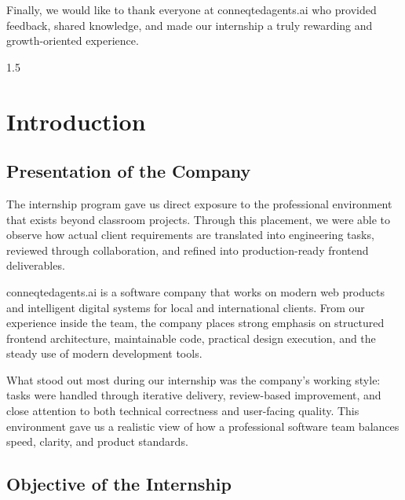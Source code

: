 \documentclass[12pt, oneside, a4paper]{book}
\begin{document}
\begin{doublespace}
Finally, we would like to thank everyone at conneqtedagents.ai who provided feedback,
shared knowledge, and made our internship a truly rewarding and growth-oriented experience.

\cleardoublepage

\begin{spacing}{1.5}
\tableofcontents
\end{spacing}

\cleardoublepage

\listoffigures

\cleardoublepage

\mainmatter

\chapter{Introduction}

\section{Presentation of the Company}

\begin{flushleft}
The internship program gave us direct exposure to the professional environment that exists
beyond classroom projects. Through this placement, we were able to observe how actual
client requirements are translated into engineering tasks, reviewed through collaboration,
and refined into production-ready frontend deliverables.

conneqtedagents.ai is a software company that works on modern web products and intelligent
digital systems for local and international clients. From our experience inside the team,
the company places strong emphasis on structured frontend architecture, maintainable code,
practical design execution, and the steady use of modern development tools.

What stood out most during our internship was the company's working style: tasks were
handled through iterative delivery, review-based improvement, and close attention to both
technical correctness and user-facing quality. This environment gave us a realistic view
of how a professional software team balances speed, clarity, and product standards.
\end{flushleft}

\section{Objective of the Internship}


\end{doublespace}
\end{document}
